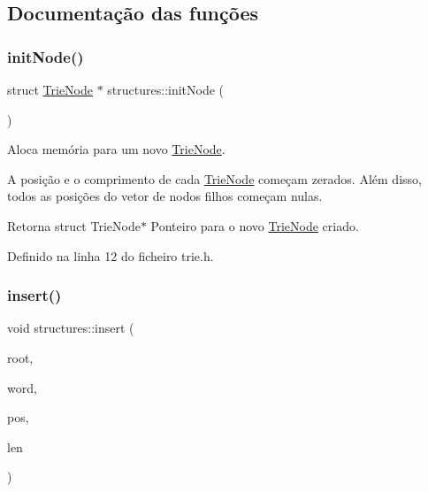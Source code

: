 \subsection{Documentação das funções}
\mbox{\label{namespacestructures_afc28a3496cec97529bc5f5cff4df903b}} 
\subsubsection{\texorpdfstring{init\+Node()}{initNode()}}
{\footnotesize\ttfamily struct \hyperlink{structstructures_1_1_trie_node}{Trie\+Node} $\ast$ structures\+::init\+Node (\begin{DoxyParamCaption}{ }\end{DoxyParamCaption})}



Aloca memória para um novo \hyperlink{structstructures_1_1_trie_node}{Trie\+Node}. 

A posição e o comprimento de cada \hyperlink{structstructures_1_1_trie_node}{Trie\+Node} começam zerados. Além disso, todos as posições do vetor de nodos filhos começam nulas.

\begin{DoxyReturn}{Retorna}
struct Trie\+Node$\ast$ Ponteiro para o novo \hyperlink{structstructures_1_1_trie_node}{Trie\+Node} criado. 
\end{DoxyReturn}


Definido na linha 12 do ficheiro trie.\+h.

\mbox{\label{namespacestructures_a4fb9d800dc8b1cd76e984a2f8e80aeae}} 
\subsubsection{\texorpdfstring{insert()}{insert()}}
{\footnotesize\ttfamily void structures\+::insert (\begin{DoxyParamCaption}\item[{struct \hyperlink{structstructures_1_1_trie_node}{Trie\+Node} $\ast$}]{root,  }\item[{std\+::string}]{word,  }\item[{int}]{pos,  }\item[{int}]{len }\end{DoxyParamCaption})}



